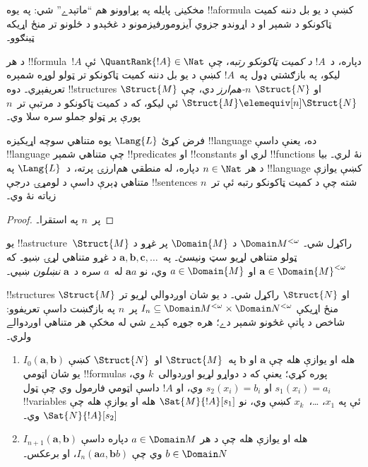 \documentclass[../../../include/open-logic-section]{subfiles}
\begin{document}
مخکينۍ پايله په پړاوونو هم ``ماتېدے'' شي: په يوه !!a{formula} کښې د
يو بل دننه کميت ټاکونکو د شمېر او د اړوندو جزوي آيزومورفيزمونو د
غځېدو د ځلونو تر منځ اړيکه ټينګوو۔

\begin{defn}
  د هر !!{formula}~$!A$ دپاره، د~$!A$ \emph{د کميت ټاکونکو رتبه}، چې
  $\QuantRank{!A} \in \Nat$ ئې ليکو، په بازګشتي ډول په~$!A$ کښې د
  يو بل دننه کميت ټاکونکو تر ټولو لوړه شمېره تعريفېږي۔ دوه
  !!{structure}s $\Struct{M}$ او $\Struct{N}$ \emph{$n$-هم‌ارز} دي،
  چې $\Struct{M} \elemequiv[n] \Struct{N}$ ئې ليکو، که د کميت
  ټاکونکو د مرتبې تر~$n$ پورې پر ټولو جملو سره سلا وي۔
\end{defn}

\begin{prop}
  فرض کړئ $\Lang{L}$ يوه متناهي سوچه اړيکيزه !!{language} ده، يعنې
  داسې !!{language} چې متناهي شمېر !!{predicate}s او !!{constant}s
  لري او !!{function}s نۀ لري۔ بيا د هر $n \in \Nat$ دپاره، له
  منطقي هم‌ارزۍ پرته، د~$\Lang{L}$ په !!{language} کښې يوازې متناهي ډېرې داسې
  د لومړۍ درجې !!{sentence}s شته چې د کميت ټاکونکو رتبه ئې تر~$n$
  زياته نۀ وي۔
\end{prop}

\begin{proof}
  پر~$n$ په استقرا۔
\end{proof}

\begin{defn}
  يو !!a{structure}~$\Struct{M}$ راکړل شي۔ $\Domain M^{<\omega}$ د
  $\Domain{M}$ پر غړو د ټولو متناهي لړيو سټ ونيسئ۔ په~$\mathbf{a}, \mathbf{b}, \mathbf{c}, \ldots$ د غړو متناهي لړۍ ښيو۔ که
  $\mathbf{a} \in \Domain{M}^{<\omega}$ او $a \in \Domain{M}$ وي، نو
  $\mathbf{a}a$ له~$a$ سره د~$\mathbf{a}$ \emph{نښلون} ښيي۔
\end{defn}

\begin{defn}
  !!{structure}s $\Struct{M}$ او $\Struct{N}$ راکړل شي۔ د يو شان
  اوږدوالي لړيو تر منځ اړيکې
  $I_n \subseteq \Domain M^{<\omega} \times \Domain N^{<\omega}$
  پر~$n$ په بازګښت داسې تعريفوو: شاخص د پاتې غځونو شمېر دے؛ هره جوړه کېدے شي له مخکې هر متناهي اوږدوالے ولري۔
   \begin{enumerate}
   \item $I_0(\mathbf{a},\mathbf{b})$ هله او يوازې هله چې
     $\mathbf{a}$ او $\mathbf{b}$ په~$\Struct{M}$ او~$\Struct{N}$
     کښې يو شان اټومي !!{formula}s پوره کړي؛ يعنې که د دواړو لړيو
     اوږدوالی~$k$ وي، $s_1(x_i) = a_i$ او $s_2(x_i) = b_i$ وي، او
     $!A$ داسې اټومي فارمول وي چې ټول !!{variable}s ئې په
     $x_1$، \dots،~$x_k$ کښې وي، نو $\Sat{M}{!A}[s_1]$ هله او يوازې
     هله چې $\Sat{N}{!A}[s_2]$ وي۔
   \item $I_{n+1} (\mathbf{a},\mathbf{b})$ هله او يوازې هله چې د هر
     $a\in \Domain M$ دپاره داسې $b\in \Domain N$ وي چې
     $I_n(\mathbf{a}a,\mathbf{b}b)$، او برعکس۔
   \end{enumerate}
\end{defn}
\end{document}

